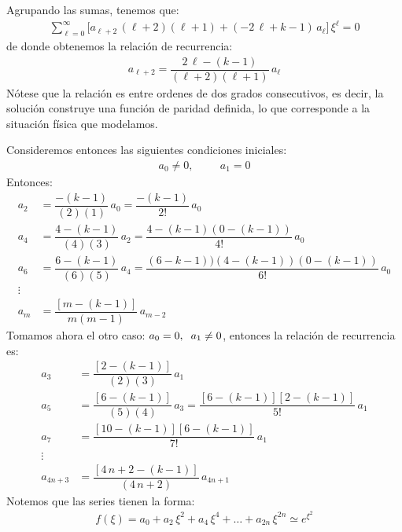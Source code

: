 Agrupando las sumas, tenemos que:
\begin{align*}
\sum_{\ell=0}^{\infty} \big[ a_{\ell+2} \, (\ell + 2)(\ell + 1) + (- 2 \, \ell + k - 1) \, a_{\ell} \big] \, \xi^{\ell} = 0
\end{align*}
de donde obtenemos la relación de recurrencia:
\begin{align*}
a_{\ell + 2} = \dfrac{2\, \ell - (k - 1)}{(\ell + 2)(\ell + 1)} \, a_{\ell}
\end{align*}
Nótese que la relación es entre ordenes de dos grados consecutivos, es decir, la solución construye una función de paridad definida, lo que corresponde a la situación física que modelamos.
\par
Consideremos entonces las siguientes condiciones iniciales:
\begin{align*}
a_{0} \neq 0, \hspace{1cm} a_{1} = 0
\end{align*}
Entonces:
\begin{align*}
a_{2} &= \dfrac{- (k - 1)}{(2)(1)} \, a_{0} = \dfrac{-(k - 1)}{2!} \, a_{0} \\[0.5em]
a_{4} &= \dfrac{4 - (k - 1)}{(4)(3)} \, a_{2} = \dfrac{4 -(k - 1)(0 - (k - 1))}{4!} \, a_{0} \\[0.5em]
a_{6} &= \dfrac{6 - (k - 1)}{(6)(5)} \, a_{4} = \dfrac{(6 - k - 1)) (4 -(k - 1))(0 - (k - 1))}{6!} \, a_{0} \\[0.5em]
\vdots \\[0.5em]
a_{m} &= \dfrac{[m - (k - 1)]}{m (m -1)} \, a_{m-2}
\end{align*}
Tomamos ahora el otro caso: $a_{0} = 0, \hspace{0.2cm} a_{1} \neq 0$, entonces la relación de recurrencia es:
\begin{align*}
a_{3} &= \dfrac{[2 - (k - 1)]}{(2)(3)} \, a_{1} \\[0.5em]
a_{5} &= \dfrac{[6 - (k - 1)]}{(5)(4)} \, a_{3} = \dfrac{[6 - (k - 1)][2 - (k -  1)]}{5!} \, a_{1} \\[0.5em]
a_{7} &= \dfrac{[10 - (k - 1)][6 - (k - 1)]}{7!} \, a_{1} \\[0.5em]
\vdots \\[0.5em]
a_{4n+3} &= \dfrac{[4 \, n + 2 - (k - 1)]}{(4 \, n + 2)} \, a_{4n+1}
\end{align*}
Notemos que las series tienen la forma:
\begin{align*}
f(\xi) = a_{0} + a_{2} \, \xi^{2} + a_{4} \, \xi^{4} + \ldots + a_{2n} \, \xi^{2n} \simeq e^{\xi^{2}}
\end{align*}
